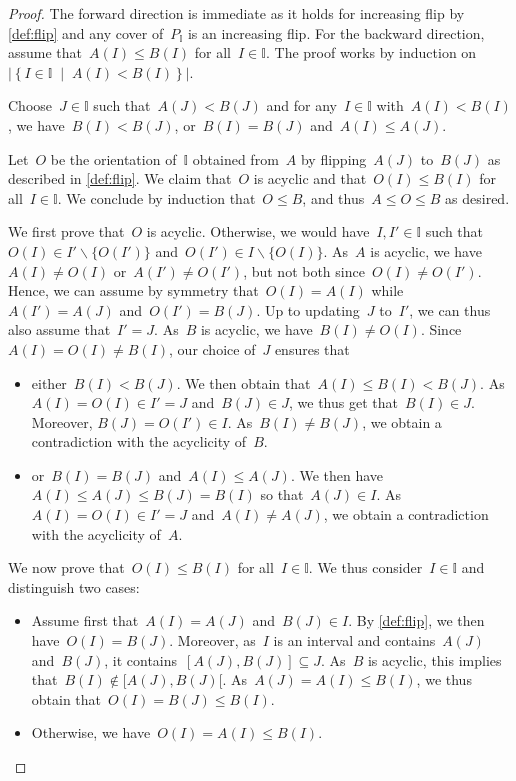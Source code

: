 \documentclass{amsart}
\theoremstyle{definition}
\newcommand{\set}[2]{\left\{ #1 \;\middle|\; #2 \right\}} %
\newcommand{\ssm}{\smallsetminus} %
\newcommand{\Nantel}[1]{\todo[inline,color=red!30]{#1 \\ \hfill --- N.}}
\newcommand{\vincent}[1]{\todo[size=\tiny,color=blue!30]{ #1 \\ \hfill --- V.}\,}
\newcommand{\II}{\mathbb I} %
\begin{document}
\begin{proof}
The forward direction is immediate as it holds for increasing flip by \cref{def:flip} and any cover of~$P_\II$ is an increasing flip.
For the backward direction, assume that~$A(I) \le B(I)$ for all~$I \in \II$.
The proof works by induction on~$|\set{I \in \II}{A(I) < B(I)}|$.

Choose~$J \in \II$ such that~$A(J) < B(J)$ and for any~$I \in \II$ with~$A(I) < B(I)$, we have~$B(I) < B(J)$, or~$B(I) = B(J)$ and~$A(I) \le A(J)$.

Let~$O$ be the orientation of~$\II$ obtained from~$A$ by flipping~$A(J)$ to~$B(J)$ as described in \cref{def:flip}.
We claim that~$O$ is acyclic and that~$O(I) \le B(I)$ for all~$I \in \II$. 
We conclude by induction that~$O \le B$, and thus~$A \le O \le B$ as desired.

We first prove that~$O$ is acyclic.
Otherwise, we would have~$I,I' \in \II$ such that~$O(I) \in I' \ssm \{O(I')\}$ and~$O(I') \in I \ssm \{O(I)\}$.
As~$A$ is acyclic, we have~$A(I) \ne O(I)$ or~$A(I') \ne O(I')$, but not both since~$O(I) \ne O(I')$.
Hence, we can assume by symmetry that~$O(I) = A(I)$ while~$A(I') = A(J)$ and~$O(I') = B(J)$.
Up to updating~$J$ to~$I'$, we can thus also assume that~$I' = J$.
As~$B$ is acyclic, we have~$B(I) \ne O(I)$.
Since~$A(I) = O(I) \ne B(I)$, our choice of~$J$ ensures that
\begin{itemize}
\item either~$B(I) < B(J)$. 
We then obtain that~$A(I) \le B(I) < B(J)$.
As~$A(I) = O(I) \in I' = J$ and~$B(J) \in J$, we thus get that~$B(I) \in J$.
Moreover, $B(J) = O(I') \in I$.
As~$B(I) \ne B(J)$, we obtain a contradiction with the acyclicity of~$B$.
\item or~$B(I) = B(J)$ and~$A(I) \le A(J)$.
We then have~$A(I) \le A(J) \le B(J) = B(I)$ so that~$A(J) \in I$.
As~$A(I) = O(I) \in I' = J$ and~$A(I) \ne A(J)$, we obtain a contradiction with the acyclicity of~$A$.
\end{itemize}

We now prove that~$O(I) \le B(I)$ for all~$I \in \II$.
We thus consider~$I \in \II$ and distinguish two cases:
\begin{itemize}
\item Assume first that~$A(I) = A(J)$ and~$B(J) \in I$. By \cref{def:flip}, we then have~${O(I) = B(J)}$. Moreover, as~$I$ is an interval and contains~$A(J)$ and~$B(J)$, it contains~$[A(J), B(J)] \subseteq J$. As~$B$ is acyclic, this implies that~$B(I) \notin {[A(J), B(J)[}$. As~$A(J) = A(I) \le B(I)$, we thus obtain that~$O(I) = B(J) \le B(I)$.
\item Otherwise, we have~$O(I) = A(I) \le B(I)$.
\qedhere
\end{itemize}
\end{proof}
\end{document}
